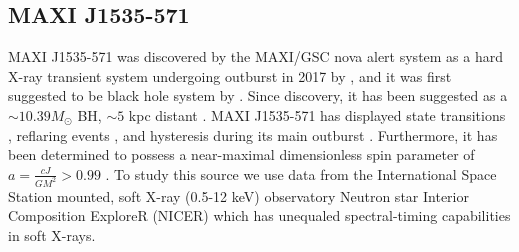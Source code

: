\documentclass[fleqn,usenatbib,twocolumn]{mnras}%
\begin{document}
\subsection{MAXI J1535-571}

MAXI J1535-571 was discovered by the MAXI/GSC nova alert system as a hard X-ray transient system undergoing outburst in 2017 by \cite{maxiATELdiscovery}, and it was first suggested to be black hole system by \cite{MAXIisBHATel}. Since discovery, it has been suggested as a $\sim 10.39M_{\odot}$ BH, $\sim 5$ kpc distant \citep{MAXI-distance}. MAXI J1535-571 has displayed state transitions \citep{Nakahira2018}, reflaring events \citep{cuneo2020}, and hysteresis during its main outburst \citep{hysteresis-MAXI}. Furthermore, it has been determined to possess a near-maximal dimensionless spin parameter of $a = \frac{cJ}{GM^2}>0.99$ \citep{miller2018,HXMT-MAXI-SPIN}. To study this source we use data from the International Space Station mounted, soft X-ray (0.5-12 keV) observatory Neutron star Interior Composition ExploreR (NICER) \citep{NICER} which has unequaled spectral-timing capabilities in soft X-rays.  
\end{document}
